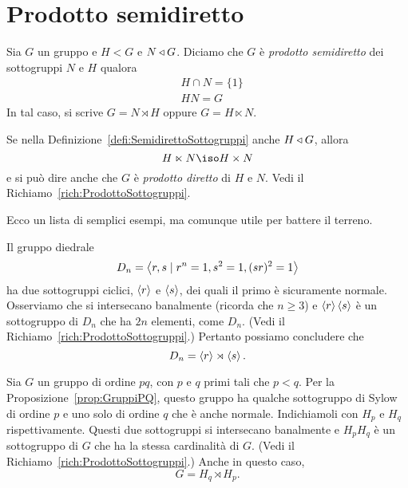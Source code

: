 
\section{Prodotto semidiretto}

\begin{defi}\label{defi:SemidirettoSottogruppi}
Sia $G$ un gruppo e $H < G$ e $N \triangleleft G$. Diciamo che $G$ è {\em prodotto semidiretto} dei sottogruppi $N$ e $H$ qualora
\begin{align*}
& H \cap N = \{1\} \\
& HN = G
\end{align*}
In tal caso, si scrive $G = N \rtimes H$ oppure $G = H \ltimes N$.
\end{defi}

\begin{osse}
Se nella Definizione~\ref{defi:SemidirettoSottogruppi} anche $H \triangleleft G$, allora 
\[H \ltimes N \iso H \times N\]
e si può dire anche che $G$ è {\em prodotto diretto} di $H$ e $N$. Vedi il Richiamo~\ref{rich:ProdottoSottogruppi}.
\end{osse}

Ecco un lista di semplici esempi, ma comunque utile per battere il terreno.

\begin{esem}
Il gruppo diedrale 
\[D_n = \left\langle r, s \mid r^n = 1, s^2 = 1, (sr)^2 = 1\right\rangle\]
ha due sottogruppi ciclici, $\left\langle r\right\rangle$ e $\left\langle s\right\rangle$, dei quali il primo è sicuramente normale.  Osserviamo che si intersecano banalmente (ricorda che $n \ge 3$) e $\left\langle r\right\rangle \left\langle s\right\rangle$ è un sottogruppo di $D_n$ che ha $2n$ elementi, come $D_n$. (Vedi il Richiamo~\ref{rich:ProdottoSottogruppi}.) Pertanto possiamo concludere che
\[D_n = \left\langle r\right\rangle \rtimes \left\langle s\right\rangle .\]
\end{esem}

\begin{esem}
Sia $G$ un gruppo di ordine $pq$, con $p$ e $q$ primi tali che $p < q$. Per la Proposizione~\ref{prop:GruppiPQ}, questo gruppo ha qualche sottogruppo di Sylow di ordine $p$ e uno solo di ordine $q$ che è anche normale. Indichiamoli con $H_p$ e $H_q$ rispettivamente. Questi due sottogruppi si intersecano banalmente e $H_pH_q$ è un sottogruppo di $G$ che ha la stessa cardinalità di $G$. (Vedi il Richiamo~\ref{rich:ProdottoSottogruppi}.) Anche in questo caso,
\[G = H_q \rtimes H_p .\]
\end{esem}

